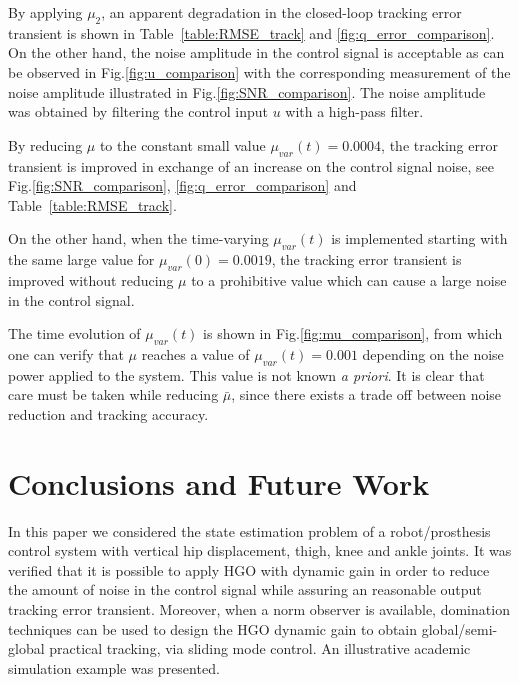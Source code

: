 \documentclass[letterpaper, 10 pt, conference]{ieeeconf}  %
\theoremstyle{plain}
\theoremstyle{definition}
\theoremstyle{remark}
\begin{document}
%
By applying $\mu_{2}$, an apparent degradation in the closed-loop tracking error transient is shown in Table~\ref{table:RMSE_track} and \ref{fig:q_error_comparison}. On the other hand, the noise amplitude in the control signal is acceptable as can be observed in Fig.\ref{fig:u_comparison} with the corresponding measurement of the noise amplitude illustrated in Fig.\ref{fig:SNR_comparison}. The noise amplitude was obtained by filtering the control input $u$ with a high-pass filter.
%

%
By reducing $\mu$ to the constant small value $\mu_{var}(t) = 0.0004$, the  tracking error transient is improved in exchange of an increase on the control signal noise, see  Fig.\ref{fig:SNR_comparison}, \ref{fig:q_error_comparison} and Table~\ref{table:RMSE_track}.
%

%
On the other hand, when the time-varying $\mu_{var}(t)$ is implemented starting with the same large value for
$\mu_{var}(0) = 0.0019$, the tracking error transient is improved without reducing $\mu$ to a prohibitive value which can cause a large noise in the control signal. 
%

%
The time evolution of $\mu_{var}(t)$ is shown in Fig.\ref{fig:mu_comparison}, from which one can verify
that $\mu$ reaches a value of $\mu_{var}(t)=0.001$ depending on the noise power applied  to the system. 
This value is not known {\em a priori}. It is clear that care must be taken while reducing $\bar{\mu}$, since there exists a trade off between noise reduction and tracking accuracy.
%
%


\section{Conclusions and Future Work}
\label{sec:Conclusions}

In this paper we considered the state estimation problem of a robot/prosthesis control system with vertical hip displacement, thigh, knee and ankle joints.  It was verified that it is possible to apply HGO with dynamic gain in order to reduce the amount of noise in the control signal while assuring an reasonable output tracking error transient. Moreover, when a norm observer is available, domination techniques can be used to design the HGO dynamic gain to obtain global/semi-global practical tracking, via sliding mode control. An illustrative academic simulation example was presented.
\end{document}
